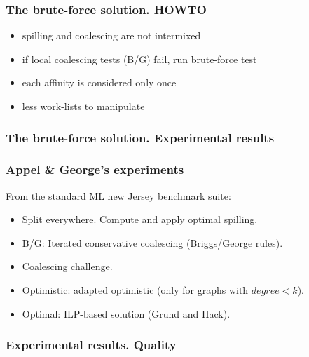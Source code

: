 \begin{frame}[label=scheme]
\frametitle{The \textsf{brute-force} solution. HOWTO}
%

%
%
%

\begin{itemize}
  \item[\txtimpl] spilling and coalescing are not intermixed
  \item[\txtimpl] if local coalescing tests (B/G) fail, run
  \textsf{brute-force} test
  \item<2->[\txtimpl] each affinity is considered only once
  \item<4>[\txtimpl] less work-lists to manipulate
\end{itemize}
\end{frame}

\subsubsection*{The {\sf brute-force} solution. Experimental results}

\begin{frame}[label=past]
\frametitle{Appel \& George's experiments}
From the standard ML new Jersey benchmark suite:
\begin{itemize}
 \item  Split everywhere. Compute and apply optimal spilling.
 \item  B/G: Iterated conservative coalescing (Briggs/George rules).
 \item[\txtimpl]  Coalescing challenge.
 \item  Optimistic: adapted optimistic (only for graphs with $degree < k$).
 \item Optimal: ILP-based solution (Grund and Hack).
\end{itemize}

\begin{center}

\end{center}
\end{frame}

\begin{frame}[label=past]
\frametitle{Experimental results. Quality}
\begin{center}

\end{center}
\end{frame}

